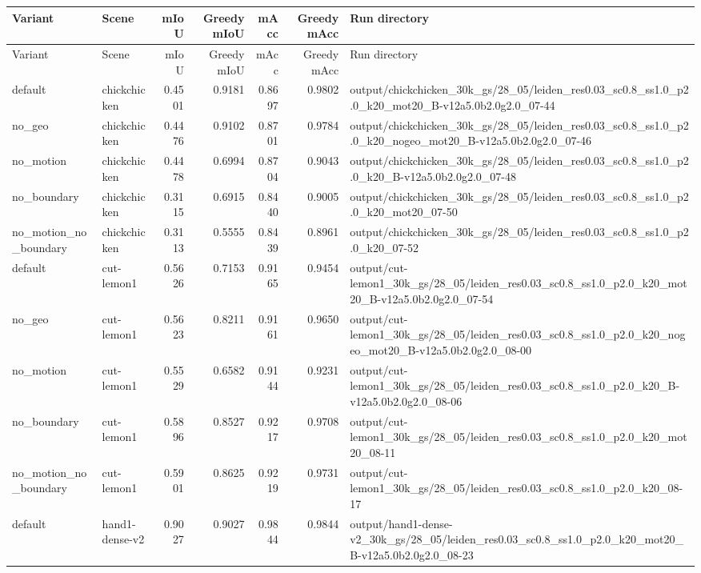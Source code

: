 \documentclass[10pt]{article}
\begin{document}
\small
\begin{longtable}{llrrrrp{9cm}}
\toprule
Variant & Scene & mIoU & Greedy mIoU & mAcc & Greedy mAcc & Run directory \\
\midrule
\endfirsthead
\toprule
Variant & Scene & mIoU & Greedy mIoU & mAcc & Greedy mAcc & Run directory \\
\midrule
\endhead
default & chickchicken & 0.4501 & 0.9181 & 0.8697 & 0.9802 & output/chickchicken\_30k\_gs/28\_05/leiden\_res0.03\_sc0.8\_ss1.0\_p2.0\_k20\_mot20\_B-v12a5.0b2.0g2.0\_07-44 \\
no\_geo & chickchicken & 0.4476 & 0.9102 & 0.8701 & 0.9784 & output/chickchicken\_30k\_gs/28\_05/leiden\_res0.03\_sc0.8\_ss1.0\_p2.0\_k20\_nogeo\_mot20\_B-v12a5.0b2.0g2.0\_07-46 \\
no\_motion & chickchicken & 0.4478 & 0.6994 & 0.8704 & 0.9043 & output/chickchicken\_30k\_gs/28\_05/leiden\_res0.03\_sc0.8\_ss1.0\_p2.0\_k20\_B-v12a5.0b2.0g2.0\_07-48 \\
no\_boundary & chickchicken & 0.3115 & 0.6915 & 0.8440 & 0.9005 & output/chickchicken\_30k\_gs/28\_05/leiden\_res0.03\_sc0.8\_ss1.0\_p2.0\_k20\_mot20\_07-50 \\
no\_motion\_no\_boundary & chickchicken & 0.3113 & 0.5555 & 0.8439 & 0.8961 & output/chickchicken\_30k\_gs/28\_05/leiden\_res0.03\_sc0.8\_ss1.0\_p2.0\_k20\_07-52 \\
default & cut-lemon1 & 0.5626 & 0.7153 & 0.9165 & 0.9454 & output/cut-lemon1\_30k\_gs/28\_05/leiden\_res0.03\_sc0.8\_ss1.0\_p2.0\_k20\_mot20\_B-v12a5.0b2.0g2.0\_07-54 \\
no\_geo & cut-lemon1 & 0.5623 & 0.8211 & 0.9161 & 0.9650 & output/cut-lemon1\_30k\_gs/28\_05/leiden\_res0.03\_sc0.8\_ss1.0\_p2.0\_k20\_nogeo\_mot20\_B-v12a5.0b2.0g2.0\_08-00 \\
no\_motion & cut-lemon1 & 0.5529 & 0.6582 & 0.9144 & 0.9231 & output/cut-lemon1\_30k\_gs/28\_05/leiden\_res0.03\_sc0.8\_ss1.0\_p2.0\_k20\_B-v12a5.0b2.0g2.0\_08-06 \\
no\_boundary & cut-lemon1 & 0.5896 & 0.8527 & 0.9217 & 0.9708 & output/cut-lemon1\_30k\_gs/28\_05/leiden\_res0.03\_sc0.8\_ss1.0\_p2.0\_k20\_mot20\_08-11 \\
no\_motion\_no\_boundary & cut-lemon1 & 0.5901 & 0.8625 & 0.9219 & 0.9731 & output/cut-lemon1\_30k\_gs/28\_05/leiden\_res0.03\_sc0.8\_ss1.0\_p2.0\_k20\_08-17 \\
default & hand1-dense-v2 & 0.9027 & 0.9027 & 0.9844 & 0.9844 & output/hand1-dense-v2\_30k\_gs/28\_05/leiden\_res0.03\_sc0.8\_ss1.0\_p2.0\_k20\_mot20\_B-v12a5.0b2.0g2.0\_08-23 \\

\end{longtable}
\end{document}
